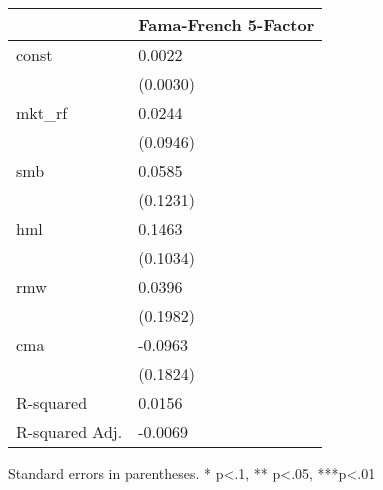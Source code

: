 \begin{table}
\caption{}
\label{}
\begin{center}
\begin{tabular}{ll}
\hline
               & Fama-French 5-Factor  \\
\hline
const          & 0.0022                \\
               & (0.0030)              \\
mkt\_rf        & 0.0244                \\
               & (0.0946)              \\
smb            & 0.0585                \\
               & (0.1231)              \\
hml            & 0.1463                \\
               & (0.1034)              \\
rmw            & 0.0396                \\
               & (0.1982)              \\
cma            & -0.0963               \\
               & (0.1824)              \\
R-squared      & 0.0156                \\
R-squared Adj. & -0.0069               \\
\hline
\end{tabular}
\end{center}
\end{table}
\bigskip
Standard errors in parentheses. \newline 
* p<.1, ** p<.05, ***p<.01